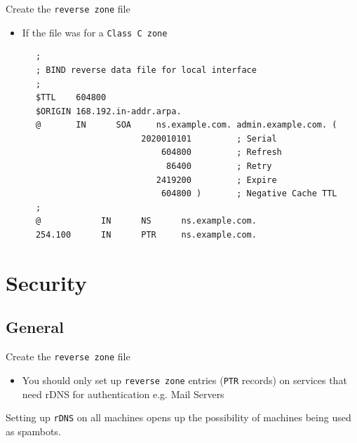 \documentclass[xcolor=table]{beamer}
\begin{document}
\begin{frame}[fragile]{Create the \texttt{reverse zone} file}
  \begin{itemize}
    \item If the file was for a \texttt{Class C zone}
  \end{itemize}
  \begin{tcolorbox}
    \lstset{
      basicstyle=\tiny\ttfamily,
    }
    \begin{lstlisting}
      ;
      ; BIND reverse data file for local interface
      ;
      $TTL    604800
      $ORIGIN 168.192.in-addr.arpa.
      @       IN      SOA     ns.example.com. admin.example.com. (
                           2020010101         ; Serial
                               604800         ; Refresh
                                86400         ; Retry
                              2419200         ; Expire
                               604800 )       ; Negative Cache TTL
      ;
      @            IN      NS      ns.example.com.
      254.100      IN      PTR     ns.example.com.
          \end{lstlisting}
  \end{tcolorbox}
\end{frame}

\section{Security}
\subsection{General}
\begin{frame}{Create the \texttt{reverse zone} file}
  \begin{itemize}
    \item You should only set up \texttt{reverse zone} entries (\texttt{PTR} records) on services that need rDNS for authentication e.g. Mail Servers
  \end{itemize}
  \begin{tcolorbox}[title={\textbf{NOTE:}}]
    \begin{center}
      \scriptsize Setting up \texttt{rDNS} on all machines opens up the possibility of machines being used as spambots.
    \end{center}
  \end{tcolorbox}
\end{frame}
\end{document}
